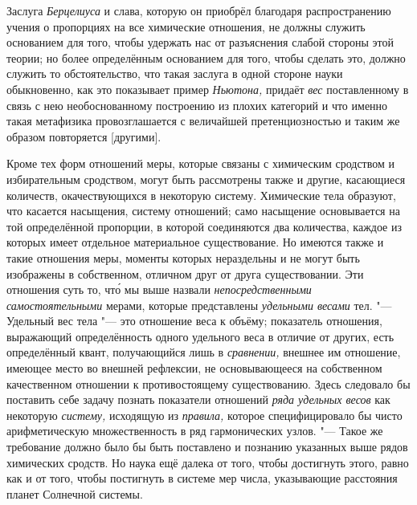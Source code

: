 Заслуга {\em Берцелиуса} и слава, которую он приобрёл благодаря распространению учения о
пропорциях на все химические отношения, не должны служить основанием для того,
чтобы удержать нас от разъяснения слабой стороны этой теории; но более
определённым основанием для того, чтобы сделать это, должно служить то
обстоятельство, что такая заслуга в одной стороне науки обыкновенно, как это
показывает пример {\em Ньютона,} придаёт {\em вес} поставленному в
связь с нею необоснованному построению из плохих категорий и что именно такая
метафизика провозглашается с величайшей претенциозностью и таким же образом
повторяется [другими].

Кроме тех форм отношений меры, которые связаны с химическим сродством и
избирательным сродством, могут быть рассмотрены также и другие, касающиеся
количеств, окачествующихся в некоторую систему. Химические тела образуют, что
касается насыщения, систему отношений; само насыщение основывается на той определённой
пропорции, в которой соединяются два количества, каждое из которых
имеет отдельное материальное существование. Но
имеются также и такие отношения меры, моменты которых нераздельны и не могут
быть изображены в собственном, отличном друг от друга существовании. Эти
отношения суть то, чт\'{о} мы выше назвали
{\em непосредственными самостоятельными} мерами, которые представлены
{\em удельными весами} тел. "--- Удельный вес тела "--- это отношение
веса к объёму; показатель отношения, выражающий определённость одного удельного
веса в отличие от других, есть определённый квант, получающийся лишь
в {\em сравнении,} внешнее им отношение, имеющее место во внешней рефлексии,
не основывающееся на собственном качественном отношении к противостоящему
существованию. Здесь следовало бы поставить себе задачу познать показатели
отношений {\em ряда удельных весов} как некоторую {\em систему,} исходящую
из {\em правила,} которое специфицировало бы чисто арифметическую
множественность в ряд гармонических узлов. "--- Такое же требование должно было
бы быть поставлено и познанию указанных выше рядов химических сродств. Но наука
ещё далека от того, чтобы достигнуть этого, равно как и от того, чтобы
постигнуть в системе мер числа, указывающие расстояния планет Солнечной
системы.

